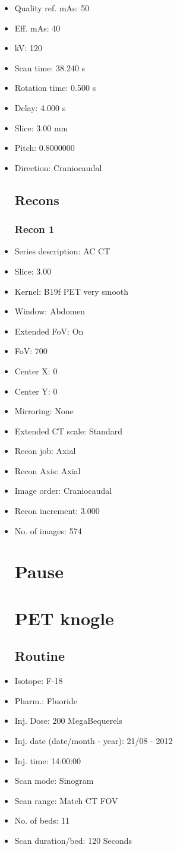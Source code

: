 \documentclass[12pt]{article}
\begin{document}
\begin{itemize}
\subsection{Scan}
\item Quality ref. mAs: 50\item Eff. mAs: 40\item kV: 120\item Scan time: 38.240 s\item Rotation time: 0.500 s\item Delay: 4.000 s\item Slice: 3.00 mm\item Pitch: 0.8000000\item Direction: Craniocaudal\subsection{Recons}

\subsubsection{Recon 1}
\item Series description: AC CT
\item Slice: 3.00
\item Kernel: B19f PET very smooth
\item Window: Abdomen
\item Extended FoV: On
\item FoV: 700
\item Center X: 0
\item Center Y: 0
\item Mirroring: None
\item Extended CT scale: Standard
\item Recon job: Axial
\item Recon Axis: Axial
\item Image order: Craniocaudal
\item Recon increment: 3.000
\item No. of images: 574
\section{Pause}
\section{PET knogle}\subsection{Routine}
\item Isotope: F-18
\item Pharm.: Fluoride
\item Inj. Dose: 200 MegaBequerels
\item Inj. date (date/month - year): 21/08 - 2012
\item Inj. time: 14:00:00
\item Scan mode: Sinogram
\item Scan range: Match CT FOV
\item No. of beds: 11
\item Scan duration/bed: 120 Seconds

\end{itemize}
\end{document}
